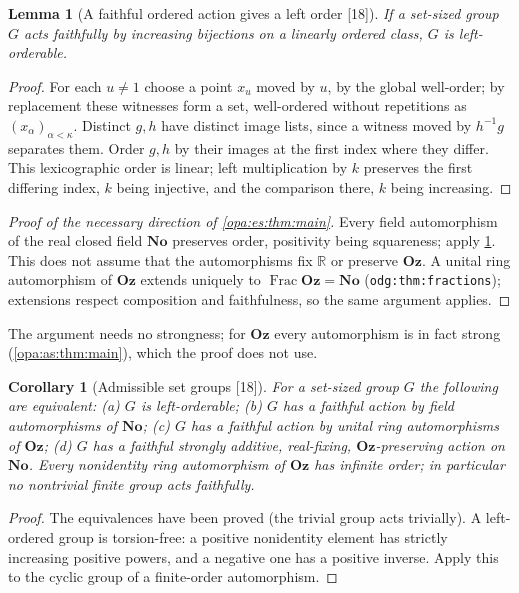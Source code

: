 \documentclass[11pt,oneside]{article}
\numberwithin{equation}{section}
\newtheorem{lemma}[lemma]{Lemma}
\newtheorem{corollary}[corollary]{Corollary}
\theoremstyle{definition}
\theoremstyle{remark}
\newcommand{\No}{\mathbf{No}}
\newcommand{\Oz}{\mathbf{Oz}}
\newcommand{\R}{\mathbb R}
\newcommand{\Frac}{\operatorname{Frac}}
\newcommand{\src}[1]{\textup{\textsf{\small[#1]}}}
\newcommand{\lbl}[1]{\nolinkurl{#1}}
\begin{document}
\begin{lemma}[A faithful ordered action gives a left order \src{18}]\label{opa:es:lem:necessity}
If a set-sized group $G$ acts faithfully by increasing bijections on a linearly ordered class, $G$ is left-orderable.
\end{lemma}
\begin{proof}
For each $u\ne1$ choose a point $x_u$ moved by $u$, by the global well-order; by replacement these witnesses form a set, well-ordered
without repetitions as $(x_\alpha)_{\alpha<\kappa}$. Distinct $g,h$ have distinct image lists, since a witness moved by $h^{-1}g$
separates them. Order $g,h$ by their images at the first index where they differ. This lexicographic order is linear; left
multiplication by $k$ preserves the first differing index, $k$ being injective, and the comparison there, $k$ being increasing.
\end{proof}

\begin{proof}[Proof of the necessary direction of \cref{opa:es:thm:main}]
Every field automorphism of the real closed field $\No$ preserves order, positivity being squareness; apply \cref{opa:es:lem:necessity}.
This does not assume that the automorphisms fix $\R$ or preserve $\Oz$. A unital ring automorphism of $\Oz$ extends uniquely to
$\Frac\Oz=\No$ (\lbl{odg:thm:fractions}); extensions respect composition and faithfulness, so the same argument applies.
\end{proof}

The argument needs no strongness; for $\Oz$ every automorphism is in fact strong (\cref{opa:as:thm:main}), which the proof does not use.

\begin{corollary}[Admissible set groups \src{18}]\label{opa:es:cor:classification}
For a set-sized group $G$ the following are equivalent: \textup{(a)} $G$ is left-orderable; \textup{(b)} $G$ has a faithful action by
field automorphisms of $\No$; \textup{(c)} $G$ has a faithful action by unital ring automorphisms of $\Oz$; \textup{(d)} $G$ has a
faithful strongly additive, real-fixing, $\Oz$-preserving action on $\No$. Every nonidentity ring automorphism of $\Oz$ has infinite
order; in particular no nontrivial finite group acts faithfully.
\end{corollary}
\begin{proof}
The equivalences have been proved (the trivial group acts trivially). A left-ordered group is torsion-free: a positive nonidentity
element has strictly increasing positive powers, and a negative one has a positive inverse. Apply this to the cyclic group of a
finite-order automorphism.
\end{proof}
\end{document}

